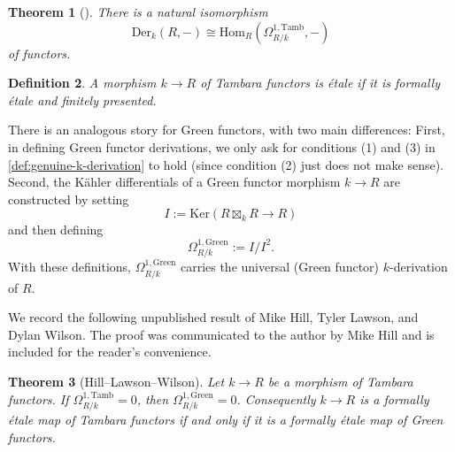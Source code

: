 \documentclass[11pt,dvipsnames]{amsart}
\newtheorem{theorem}{Theorem}[section]
\theoremstyle{BoldRemark}
\newtheorem{definition}[theorem]{Definition}
\newcommand{\Hom}{\mathrm{Hom}}
\newcommand{\Der}{\mathrm{Der}}
\newcommand{\Tamb}{\mathrm{Tamb}}
\newcommand{\Green}{\mathrm{Green}}
\begin{document}
\begin{theorem}[{\cite[Theorem 5.7]{Hil17}}]
    There is a natural isomorphism 
    \[ 
        \Der_k(R,-) \cong \Hom_R(\Omega^{1,\Tamb}_{R/k},-) 
    \] 
    of functors.
\end{theorem}

\begin{definition}
	A morphism $k \rightarrow R$ of Tambara functors is \emph{\'{e}tale} if it is formally \'{e}tale and finitely presented.
\end{definition}

There is an analogous story for Green functors, with two main differences: First, in defining Green functor derivations, we only ask for conditions (1) and (3) in \cref{def:genuine-k-derivation} to hold (since condition (2) just does not make sense). Second, the K\"{a}hler differentials of a Green functor morphism $k \rightarrow R$ are constructed by setting
\[ 
    I := \mathrm{Ker}(R \boxtimes_k R \rightarrow R) 
\] 
and then defining
\[ 
    \Omega^{1,\Green}_{R/k} := I/I^2 . 
\]
With these definitions, $\Omega^{1,\Green}_{R/k}$ carries the universal (Green functor) $k$-derivation of $R$.

We record the following unpublished result of Mike Hill, Tyler Lawson, and Dylan Wilson. The proof was communicated to the author by Mike Hill and is included for the reader's convenience.

\begin{theorem}[Hill--Lawson--Wilson]\label{thm:Green-etale-implies-Tambara-etale}
    Let $k \rightarrow R$ be a morphism of Tambara functors. If $\Omega^{1,\Tamb}_{R/k} = 0$, then $\Omega^{1,\Green}_{R/k} = 0$. Consequently $k \rightarrow R$ is a formally \'{e}tale map of Tambara functors if and only if it is a formally \'{e}tale map of Green functors.
\end{theorem}
\end{document}

